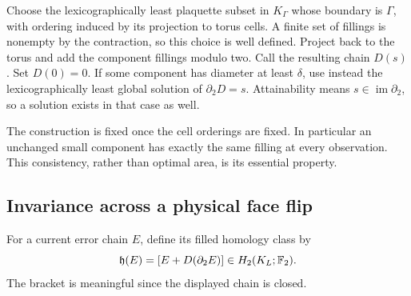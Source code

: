 Choose the lexicographically least plaquette subset in \(K_\Gamma\)
whose boundary is \(\Gamma\), with ordering induced by its projection
to torus cells. A finite set of fillings is nonempty by the
contraction, so this choice is well defined. Project back to the
torus and add the component fillings modulo two. Call the resulting
chain \(D(s)\). Set \(D(0)=0\). If some component has diameter at
least \(\delta\), use instead the lexicographically least global
solution of \(\partial_2D=s\). Attainability means
\(s\in\operatorname{im}\partial_2\), so a solution exists in that
case as well.

The construction is fixed once the cell orderings are fixed. In
particular an unchanged small component has exactly the same filling
at every observation. This consistency, rather than optimal area,
is its essential property.

\subsection{Invariance across a physical face flip}

For a current error chain \(E\), define its filled homology class by
\begin{equation}\label{eq:filled-class}
 \mathfrak h(E)=[E+D(\partial_2E)]\in H_2(K_L;\mathbb F_2).
\end{equation}
The bracket is meaningful since the displayed chain is closed.

